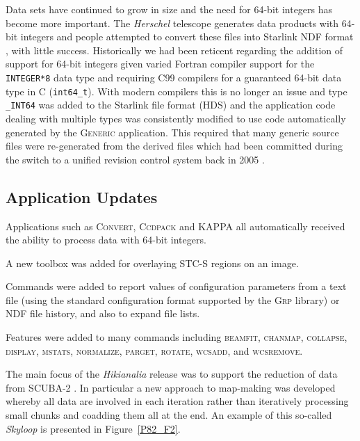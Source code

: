 \documentclass[11pt,twoside]{article}
\begin{document}
Data sets have continued to grow in size and the need for 64-bit
integers has become more important. The \textit{Herschel} telescope
generates data products with 64-bit integers and people attempted to
convert these files into Starlink NDF format \citep[see][for an
overview of NDF]{P91_adassxxiii}, with little success. Historically we
had been reticent regarding the addition of support for 64-bit
integers given varied Fortran compiler support for the
\texttt{INTEGER*8} data type and requiring C99 compilers for a
guaranteed 64-bit data type in C (\texttt{int64\_t}). With modern
compilers this is no longer an issue and type \texttt{\_INT64} was
added to the Starlink file format (HDS) and the application code
dealing with multiple types was consistently modified to use code
automatically generated by the \textsc{Generic} application. This
required that many generic source files were re-generated from the
derived files which had been committed during the switch to a unified
revision control system back in 2005 \citep{2005ASPC..347..119G}.

\subsection*{Application Updates}

Applications such as \textsc{Convert}, \textsc{Ccdpack} and
\textsc{KAPPA} all automatically received the ability to process data
with 64-bit integers.


A new toolbox was added for overlaying STC-S regions on an image.



Commands were added to report values of configuration parameters from
a text file (using the standard configuration format supported by the
\textsc{Grp} library) or NDF file history, and also to expand file lists.

Features were added to many commands including \textsc{beamfit},
\textsc{chanmap}, \textsc{collapse}, \textsc{display}, \textsc{mstats},
\textsc{normalize}, \textsc{parget}, \textsc{rotate}, \textsc{wcsadd},
and \textsc{wcsremove}.


The main focus of the \textit{Hikianalia} release was to support the
reduction of data from SCUBA-2
\citep{2013MNRAS.430.2545C}. In particular a new
approach to map-making was developed whereby all data are involved in
each iteration rather than iteratively processing small chunks and
coadding them all at the end.  An example of this so-called
\textit{Skyloop} is presented in Figure~\ref{P82_F2}.
\end{document}
